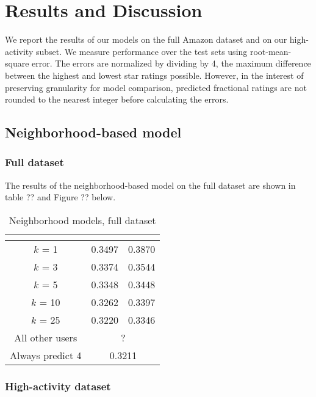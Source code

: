 \documentclass[letterpaper, 10 pt, conference]{ieeeconf}
\begin{document}
\section{Results and Discussion}
\label{sec:results}

We report the results of our models on the full Amazon dataset and on our 
high-activity subset. We measure performance over the test sets using 
root-mean-square error. The errors are normalized by dividing by 4, the maximum 
difference between the highest and lowest star ratings possible. However, 
in the interest of preserving granularity for model comparison, predicted
fractional ratings are not rounded to the nearest integer before calculating 
the errors. 

\subsection{Neighborhood-based model}
\subsubsection{Full dataset}
The results of the neighborhood-based model on the full dataset are shown in 
table ?? and Figure ?? below.


\begin{table}[htb]
\centering
\begin{tabular}{|c|c|c|}
\cline{2-3}

\multicolumn{1}{c|}{} & \vbox{\hbox{\strut Neighborhood model}} 
& \vbox{\hbox{\strut Modified }\hbox{\strut neighborhood model}} \tabularnewline \hline
$k$ = 1 & 0.3497 & 0.3870 \tabularnewline
$k$ = 3 &  0.3374 & 0.3544 \tabularnewline
$k$ = 5 & 0.3348 & 0.3448 \tabularnewline
$k$ = 10 & 0.3262 & 0.3397 \tabularnewline
$k$ = 25  & 0.3220 & 0.3346 \tabularnewline
\hline
All other users & \multicolumn{2}{|c|}{?}  \tabularnewline
\hline
Always predict 4 & \multicolumn{2}{|c|}{0.3211}  \tabularnewline
\hline
\end{tabular}
\caption{Neighborhood models, full dataset}
\end{table}

\subsubsection{High-activity dataset}
\end{document}
